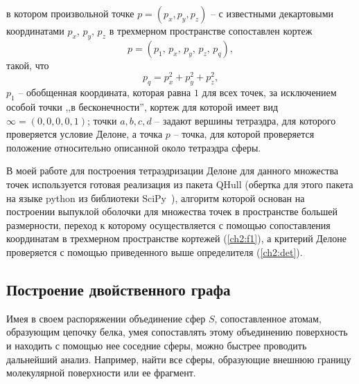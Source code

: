 в котором произвольной точке $p=(p_x, p_y, p_z)$ -- с известными декартовыми координатами $p_x$, $p_y$, $p_z$ в трехмерном пространстве сопоставлен кортеж 
\begin{equation}
p=(p_1,\,p_x,\, p_y,\, p_z,\,p_q), \label{ch2:f1}
\end{equation}
такой, что
$$
p_q=p_x^2+p_y^2+p_z^2,
$$ 
$p_1$ -- обобщенная координата, которая равна $1$ для всех точек, за исключением особой точки ,,в бесконечности'', кортеж для которой имеет вид ${\infty=(0,0,0,0,1)}$; точки $a, b, c, d$ -- задают вершины тетраэдра, для которого проверяется условие Делоне, а точка $p$ -- точка, для которой проверяется положение относительно описанной около тетраэдра сферы. 

В моей работе для построения тетраэдризации Делоне для данного множества точек используется готовая реализация из пакета QHull \cite{qhull} (обертка для этого пакета на языке  python из библиотеки SciPy~\cite{scipy}), алгоритм которой основан на построении выпуклой оболочки для множества точек в пространстве большей размерности, переход к которому осуществляется с помощью сопоставления координатам в трехмерном пространстве  кортежей (\ref{ch2:f1}), а критерий Делоне проверяется с помощью приведенного выше определителя (\ref{ch2:det}). 



\subsection{Построение двойственного графа}
Имея в своем распоряжении объединение сфер $S$, сопоставленное атомам, образующим цепочку белка, умея сопоставлять этому объединению поверхность и находить с помощью нее соседние сферы, можно быстрее проводить дальнейший анализ. Например, найти все сферы, образующие внешнюю границу молекулярной поверхности или ее фрагмент.

